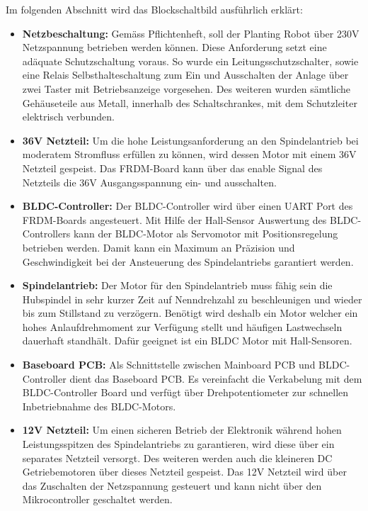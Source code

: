 Im folgenden Abschnitt wird das Blockschaltbild ausführlich erklärt:
\begin{itemize}
	\item \textbf{Netzbeschaltung:} Gemäss Pflichtenheft, soll der Planting Robot über 230V Netzspannung betrieben werden können. Diese Anforderung setzt eine adäquate Schutzschaltung voraus. So wurde ein Leitungsschutzschalter, sowie eine Relais Selbsthalteschaltung zum Ein und Ausschalten der Anlage über zwei Taster mit Betriebsanzeige vorgesehen. Des weiteren wurden sämtliche Gehäuseteile aus Metall, innerhalb des Schaltschrankes, mit dem Schutzleiter elektrisch verbunden.

	\item \textbf{36V Netzteil:} Um die hohe Leistungsanforderung an den Spindelantrieb bei moderatem Stromfluss erfüllen zu können, wird dessen Motor mit einem 36V Netzteil gespeist. Das FRDM-Board kann über das enable Signal des Netzteils die 36V Ausgangsspannung ein- und ausschalten.
	
	\item \textbf{BLDC-Controller:} Der BLDC-Controller wird über einen UART Port des FRDM-Boards angesteuert. Mit Hilfe der Hall-Sensor Auswertung des BLDC-Controllers kann der BLDC-Motor als Servomotor mit Positionsregelung betrieben werden. Damit kann ein Maximum an Präzision und Geschwindigkeit bei der Ansteuerung des Spindelantriebs garantiert werden.
	
	\item \textbf{Spindelantrieb:} Der Motor für den Spindelantrieb muss fähig sein die Hubspindel in sehr kurzer Zeit auf Nenndrehzahl zu beschleunigen und wieder bis zum Stillstand zu verzögern. Benötigt wird deshalb ein Motor welcher ein hohes Anlaufdrehmoment zur Verfügung stellt und häufigen Lastwechseln dauerhaft standhält. Dafür geeignet ist ein BLDC Motor mit Hall-Sensoren.
	
	\item \textbf{Baseboard PCB:} Als Schnittstelle zwischen Mainboard PCB und BLDC-Controller dient das Baseboard PCB. Es vereinfacht die Verkabelung mit dem BLDC-Controller Board und verfügt über Drehpotentiometer zur schnellen Inbetriebnahme des BLDC-Motors.
			
	\item \textbf{12V Netzteil:} Um einen sicheren Betrieb der Elektronik während hohen Leistungsspitzen des Spindelantriebs zu garantieren, wird diese über ein separates Netzteil versorgt. Des weiteren werden auch die kleineren DC Getriebemotoren über dieses Netzteil gespeist. Das 12V Netzteil wird über das Zuschalten der Netzspannung gesteuert und kann nicht über den Mikrocontroller geschaltet werden.
	

\end{itemize}
